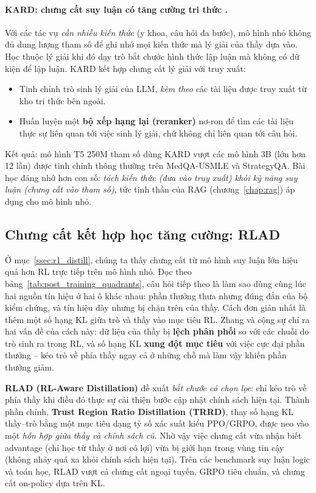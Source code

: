 \paragraph{KARD: chưng cất suy luận có tăng cường tri thức \cite{kang2023kard}.} Với các tác vụ \emph{cần nhiều kiến thức} (y khoa, câu hỏi đa bước), mô hình nhỏ không đủ dung lượng tham số để ghi nhớ mọi kiến thức mà lý giải của thầy dựa vào. Học thuộc lý giải khi đó dạy trò bắt chước hình thức lập luận mà không có dữ kiện để lập luận. KARD kết hợp chưng cất lý giải với truy xuất:
\begin{itemize}
	\item Tinh chỉnh trò sinh lý giải của LLM, \emph{kèm theo} các tài liệu được truy xuất từ kho tri thức bên ngoài.
	\item Huấn luyện một \textbf{bộ xếp hạng lại (reranker)} nơ-ron để tìm các tài liệu thực sự liên quan tới việc sinh lý giải, chứ không chỉ liên quan tới câu hỏi.
\end{itemize}
Kết quả: mô hình T5 250M tham số dùng KARD vượt các mô hình 3B (lớn hơn 12 lần) được tinh chỉnh thông thường trên MedQA-USMLE và StrategyQA. Bài học đáng nhớ hơn con số: \emph{tách kiến thức (đưa vào truy xuất) khỏi kỹ năng suy luận (chưng cất vào tham số)}, tức tinh thần của RAG (chương~\ref{chap:rag}) áp dụng cho mô hình nhỏ.

\subsection{Chưng cất kết hợp học tăng cường: RLAD}
\label{ssec:rlad}

Ở mục~\ref{ssec:r1_distill}, chúng ta thấy chưng cất từ mô hình suy luận lớn hiệu quả hơn RL trực tiếp trên mô hình nhỏ. Đọc theo bảng~\ref{tab:post_training_quadrants}, câu hỏi tiếp theo là làm sao dùng cùng lúc hai nguồn tín hiệu ở hai ô khác nhau: phần thưởng thưa nhưng đúng đắn của bộ kiểm chứng, và tín hiệu dày nhưng bị chặn trên của thầy. Cách đơn giản nhất là thêm một số hạng KL giữa trò và thầy vào mục tiêu RL. Zhang và cộng sự \cite{zhang2026rlad} chỉ ra hai vấn đề của cách này: dữ liệu của thầy bị \textbf{lệch phân phối} so với các chuỗi do trò sinh ra trong RL, và số hạng KL \textbf{xung đột mục tiêu} với việc cực đại phần thưởng -- kéo trò về phía thầy ngay cả ở những chỗ mà làm vậy khiến phần thưởng giảm.

\textbf{RLAD (RL-Aware Distillation)} đề xuất \emph{bắt chước có chọn lọc}: chỉ kéo trò về phía thầy khi điều đó thực sự cải thiện bước cập nhật chính sách hiện tại. Thành phần chính, \textbf{Trust Region Ratio Distillation (TRRD)}, thay số hạng KL thầy--trò bằng một mục tiêu dạng tỷ số xác suất kiểu PPO/GRPO, được neo vào một \emph{hỗn hợp giữa thầy và chính sách cũ}. Nhờ vậy việc chưng cất vừa nhận biết advantage (chỉ học từ thầy ở nơi có lợi) vừa bị giới hạn trong vùng tin cậy (không nhảy quá xa khỏi chính sách hiện tại). Trên các benchmark suy luận logic và toán học, RLAD vượt cả chưng cất ngoại tuyến, GRPO tiêu chuẩn, và chưng cất on-policy dựa trên KL.
